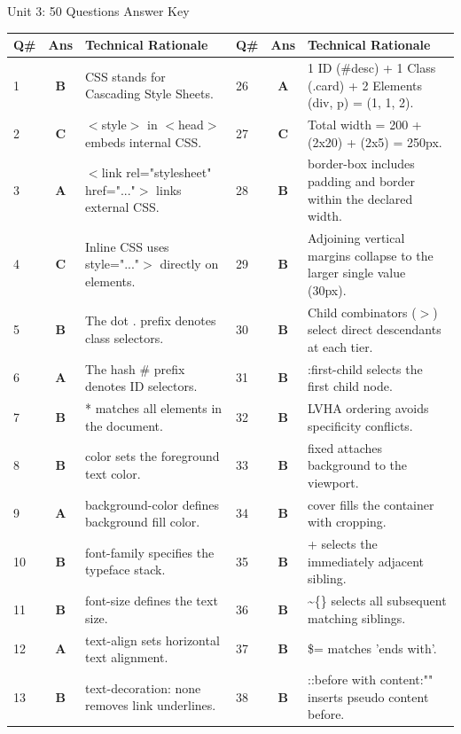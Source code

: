 \begin{answerkeytable}{Unit 3: 50 Questions Answer Key}
\begin{tabularx}{\textwidth}{l c X l c X}
\toprule
\textbf{Q\#} & \textbf{Ans} & \textbf{Technical Rationale} & \textbf{Q\#} & \textbf{Ans} & \textbf{Technical Rationale} \\
\midrule
1 & \textbf{B} & CSS stands for Cascading Style Sheets. & 26 & \textbf{A} & 1 ID (\#desc) + 1 Class (.card) + 2 Elements (div, p) = (1, 1, 2). \\
2 & \textbf{C} & $<$style$>$ in $<$head$>$ embeds internal CSS. & 27 & \textbf{C} & Total width = 200 + (2x20) + (2x5) = 250px. \\
3 & \textbf{A} & $<$link rel="stylesheet" href="..."$>$ links external CSS. & 28 & \textbf{B} & border-box includes padding and border within the declared width. \\
4 & \textbf{C} & Inline CSS uses style="..."$>$ directly on elements. & 29 & \textbf{B} & Adjoining vertical margins collapse to the larger single value (30px). \\
5 & \textbf{B} & The dot . prefix denotes class selectors. & 30 & \textbf{B} & Child combinators ($>$) select direct descendants at each tier. \\
6 & \textbf{A} & The hash \# prefix denotes ID selectors. & 31 & \textbf{B} & :first-child selects the first child node. \\
7 & \textbf{B} & * matches all elements in the document. & 32 & \textbf{B} & LVHA ordering avoids specificity conflicts. \\
8 & \textbf{B} & color sets the foreground text color. & 33 & \textbf{B} & fixed attaches background to the viewport. \\
9 & \textbf{A} & background-color defines background fill color. & 34 & \textbf{B} & cover fills the container with cropping. \\
10 & \textbf{B} & font-family specifies the typeface stack. & 35 & \textbf{B} & + selects the immediately adjacent sibling. \\
11 & \textbf{B} & font-size defines the text size. & 36 & \textbf{B} & \textasciitilde\{\} selects all subsequent matching siblings. \\
12 & \textbf{A} & text-align sets horizontal text alignment. & 37 & \textbf{B} & \$= matches 'ends with'. \\
13 & \textbf{B} & text-decoration: none removes link underlines. & 38 & \textbf{B} & ::before with content:"" inserts pseudo content before. \\

\end{tabularx}
\end{answerkeytable}
